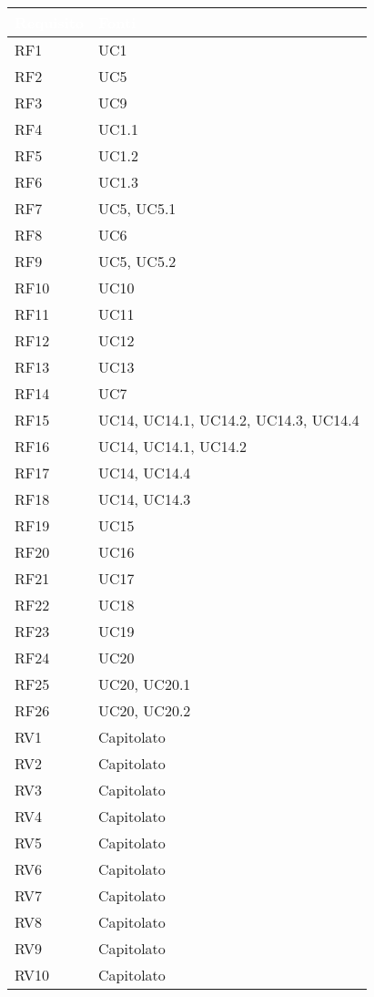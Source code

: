 {
      \setlength{\freewidth}{\dimexpr\textwidth-0\tabcolsep}
      \renewcommand{\arraystretch}{1.5}
      \centering
      \setlength{\aboverulesep}{0pt}
      \setlength{\belowrulesep}{0pt}
      \begin{longtable}{C{.47\freewidth} C{.47\freewidth}}
         \toprule
      \textcolor{white}{\textbf{Requisito}}&
      \textcolor{white}{\textbf{Fonti}}\\
      \toprule
      \endhead
      
      RF1 & UC1\\
      RF2 & UC5\\
      RF3 & UC9\\
      RF4 & UC1.1\\
      RF5 & UC1.2\\
      RF6 & UC1.3\\
      RF7 & UC5, UC5.1\\
      RF8 & UC6\\
      RF9 & UC5, UC5.2\\
      RF10 & UC10\\
      RF11 & UC11\\
      RF12 & UC12\\
      RF13 & UC13\\
      RF14 & UC7\\
      RF15 & UC14, UC14.1, UC14.2, UC14.3, UC14.4\\
      RF16 & UC14, UC14.1, UC14.2\\
      RF17 & UC14, UC14.4\\
      RF18 & UC14, UC14.3\\
      RF19 & UC15\\
      RF20 & UC16\\
      RF21 & UC17\\
      RF22 & UC18\\
      RF23 & UC19\\
      RF24 & UC20\\
      RF25 & UC20, UC20.1\\
      RF26 & UC20, UC20.2\\

      RV1 & Capitolato\\
      RV2 & Capitolato\\
      RV3 & Capitolato\\
      RV4 & Capitolato\\
      RV5 & Capitolato\\
      RV6 & Capitolato\\
      RV7 & Capitolato\\
      RV8 & Capitolato\\
      RV9 & Capitolato\\
      RV10 & Capitolato\\


\end{longtable}}
